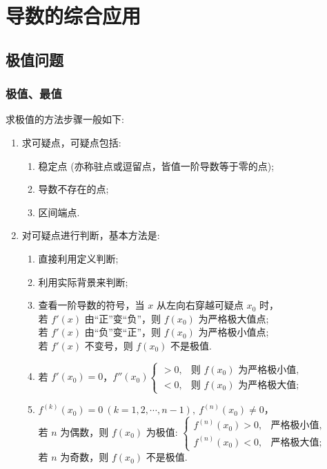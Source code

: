 \section{导数的综合应用}

\subsection{极值问题}

\subsubsection{极值、最值}

求极值的方法步骤一般如下:
\begin{enumerate}[label=(\arabic{*})]
    \item 求可疑点，可疑点包括:
          \begin{enumerate}[label=(\roman{*})]
              \item 稳定点 (亦称驻点或逗留点，皆值一阶导数等于零的点);
              \item 导数不存在的点;
              \item 区间端点.
          \end{enumerate}
    \item 对可疑点进行判断，基本方法是:
          \begin{enumerate}[label=(\roman{*})]
              \item 直接利用定义判断;
              \item 利用实际背景来判断;
              \item 查看一阶导数的符号，当 $x$ 从左向右穿越可疑点 $x_0$ 时，\\
                    若 $f'(x)$ 由“正”变“负”，则 $f(x_0)$ 为严格极大值点;\\
                    若 $f'(x)$ 由“负”变“正”，则 $f(x_0)$ 为严格极小值点;\\
                    若 $f'(x)$ 不变号，则 $f(x_0)$ 不是极值.
              \item 若 $f'(x_0)=0$，$f''(x_0)\begin{cases}
                            >0 , & \text{则 } f(x_0) \text{ 为严格极小值,} \\
                            <0 , & \text{则 } f(x_0) \text{ 为严格极大值;}
                        \end{cases}$
              \item $f^{(k)}(x_0)=0~ (k=1,2,\cdots,n-1),~f^{(n)}(x_0)\neq 0$，\\
                    若 $n$ 为偶数，则 $f(x_0)$ 为极值: $\begin{cases}
                            f^{(n)}(x_0)>0 , & \text{严格极小值,} \\
                            f^{(n)}(x_0)<0 , & \text{严格极大值;}
                        \end{cases}$\\
                    若 $n$ 为奇数，则 $f(x_0)$ 不是极值.
          \end{enumerate}
\end{enumerate}

